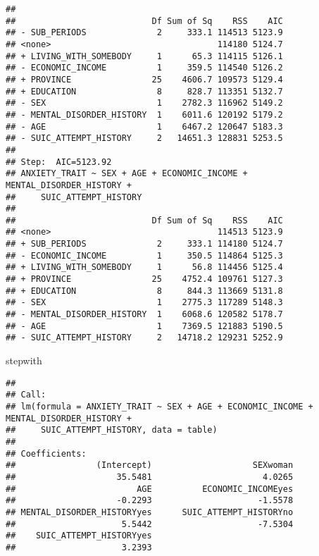 \documentclass[
]{book}
\newenvironment{Shaded}{\begin{snugshade}}{\end{snugshade}}
\newcommand{\CommentTok}[1]{\textcolor[rgb]{0.56,0.35,0.01}{\textit{#1}}}
\newcommand{\NormalTok}[1]{#1}
\newcommand{\SpecialCharTok}[1]{\textcolor[rgb]{0.00,0.00,0.00}{#1}}
\begin{document}
\begin{verbatim}
## 
##                           Df Sum of Sq    RSS    AIC
## - SUB_PERIODS              2     333.1 114513 5123.9
## <none>                                 114180 5124.7
## + LIVING_WITH_SOMEBODY     1      65.3 114115 5126.1
## - ECONOMIC_INCOME          1     359.5 114540 5126.2
## + PROVINCE                25    4606.7 109573 5129.4
## + EDUCATION                8     828.7 113351 5132.7
## - SEX                      1    2782.3 116962 5149.2
## - MENTAL_DISORDER_HISTORY  1    6011.6 120192 5179.2
## - AGE                      1    6467.2 120647 5183.3
## - SUIC_ATTEMPT_HISTORY     2   14651.3 128831 5253.5
## 
## Step:  AIC=5123.92
## ANXIETY_TRAIT ~ SEX + AGE + ECONOMIC_INCOME + MENTAL_DISORDER_HISTORY + 
##     SUIC_ATTEMPT_HISTORY
## 
##                           Df Sum of Sq    RSS    AIC
## <none>                                 114513 5123.9
## + SUB_PERIODS              2     333.1 114180 5124.7
## - ECONOMIC_INCOME          1     350.5 114864 5125.3
## + LIVING_WITH_SOMEBODY     1      56.8 114456 5125.4
## + PROVINCE                25    4752.4 109761 5127.3
## + EDUCATION                8     844.3 113669 5131.8
## - SEX                      1    2775.3 117289 5148.3
## - MENTAL_DISORDER_HISTORY  1    6068.6 120582 5178.7
## - AGE                      1    7369.5 121883 5190.5
## - SUIC_ATTEMPT_HISTORY     2   14718.2 129231 5252.9
\end{verbatim}

\begin{Shaded}
\begin{Highlighting}[]
\NormalTok{stepwith}
\end{Highlighting}
\end{Shaded}

\begin{verbatim}
## 
## Call:
## lm(formula = ANXIETY_TRAIT ~ SEX + AGE + ECONOMIC_INCOME + MENTAL_DISORDER_HISTORY + 
##     SUIC_ATTEMPT_HISTORY, data = table)
## 
## Coefficients:
##                (Intercept)                    SEXwoman  
##                    35.5481                      4.0265  
##                        AGE          ECONOMIC_INCOMEyes  
##                    -0.2293                     -1.5578  
## MENTAL_DISORDER_HISTORYyes      SUIC_ATTEMPT_HISTORYno  
##                     5.5442                     -7.5304  
##    SUIC_ATTEMPT_HISTORYyes  
##                     3.2393
\end{verbatim}

\begin{Shaded}
\end{Shaded}
\end{document}
